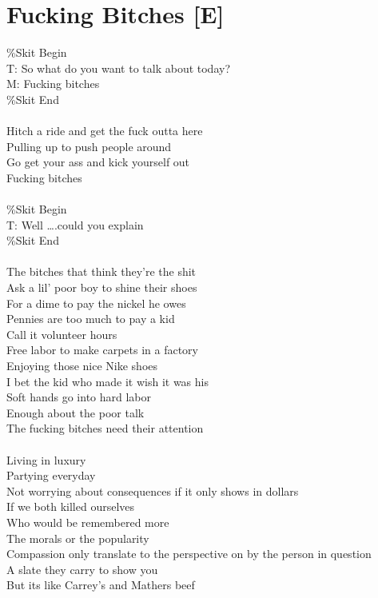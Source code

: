 \documentclass[12pt, b5paper, oneside]{book}
\begin{document}
\section{Fucking Bitches [E]}
\%Skit Begin
\\T: So what do you want to talk about today?
\\M: Fucking bitches
\\\%Skit End
%
\\\\Hitch a ride and get the fuck outta here
\\Pulling up to push people around
\\Go get your ass and kick yourself out
\\Fucking bitches
%
\\\\\%Skit Begin
\\T: Well \dots .could you explain
\\\%Skit End
%
\\\\The bitches that think they're the shit
\\Ask a lil' poor boy to shine their shoes
\\For a dime to pay the nickel he owes
\\Pennies are too much to pay a kid
\\Call it volunteer hours
\\Free labor to make carpets in a factory
\\Enjoying those nice Nike shoes
\\I bet the kid who made it wish it was his
\\Soft hands go into hard labor
\\Enough about the poor talk
\\The fucking bitches need their attention
%
\\\\Living in luxury
\\Partying everyday
\\Not worrying about consequences if it only shows in dollars
\\If we both killed ourselves
\\Who would be remembered more
\\The morals or the popularity
\\Compassion only translate to the perspective on by the person in question
\\A slate they carry to show you
\\But its like Carrey's and Mathers beef
\end{document}
